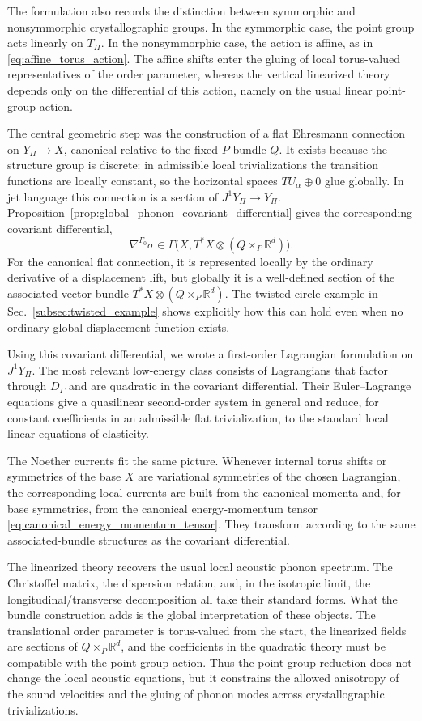 \documentclass[11pt]{amsart}
\theoremstyle{plain}
\theoremstyle{definition}
\theoremstyle{remark}
\begin{document}
The formulation also records the distinction between symmorphic and nonsymmorphic crystallographic groups. 
In the symmorphic case, the point group acts linearly on \(T_\Pi\). 
In the nonsymmorphic case, the action is affine, as in \eqref{eq:affine_torus_action}. 
The affine shifts enter the gluing of local torus-valued representatives of the order parameter, whereas the vertical linearized theory depends only on the differential of this action, namely on the usual linear point-group action.

The central geometric step was the construction of a flat Ehresmann connection on \(Y_\Pi\to X\), canonical relative to the fixed \(P\)-bundle \(Q\). 
It exists because the structure group is discrete: in admissible local trivializations the transition functions are locally constant, so the horizontal spaces \(TU_\alpha\oplus0\) glue globally. 
In jet language this connection is a section of \(J^1Y_\Pi\to Y_\Pi\). 
Proposition~\ref{prop:global_phonon_covariant_differential} gives the corresponding covariant differential,
\[
\nabla^{\Gamma_0}\sigma\in
\Gamma\bigl(X,T^*X\otimes(Q\times_P\mathbb R^d)\bigr).
\]
For the canonical flat connection, it is represented locally by the ordinary derivative of a displacement lift, but globally it is a well-defined section of the associated vector bundle \(T^*X\otimes(Q\times_P\mathbb R^d)\). 
The twisted circle example in Sec.~\ref{subsec:twisted_example} shows explicitly how this can hold even when no ordinary global displacement function exists.

Using this covariant differential, we wrote a first-order Lagrangian formulation on \(J^1Y_\Pi\). 
The most relevant low-energy class consists of Lagrangians that factor through \(D_\Gamma\) and are quadratic in the covariant differential. 
Their Euler--Lagrange equations give a quasilinear second-order system in general and reduce, for constant coefficients in an admissible flat trivialization, to the standard local linear equations of elasticity.

The Noether currents fit the same picture. 
Whenever internal torus shifts or symmetries of the base \(X\) are variational symmetries of the chosen Lagrangian, the corresponding local currents are built from the canonical momenta and, for base symmetries, from the canonical energy-momentum tensor \eqref{eq:canonical_energy_momentum_tensor}. 
They transform according to the same associated-bundle structures as the covariant differential.

The linearized theory recovers the usual local acoustic phonon spectrum. 
The Christoffel matrix, the dispersion relation, and, in the isotropic limit, the longitudinal/transverse decomposition all take their standard forms. 
What the bundle construction adds is the global interpretation of these objects. 
The translational order parameter is torus-valued from the start, the linearized fields are sections of \(Q\times_P\mathbb R^d\), and the coefficients in the quadratic theory must be compatible with the point-group action. 
Thus the point-group reduction does not change the local acoustic equations, but it constrains the allowed anisotropy of the sound velocities and the gluing of phonon modes across crystallographic trivializations.
\end{document}

